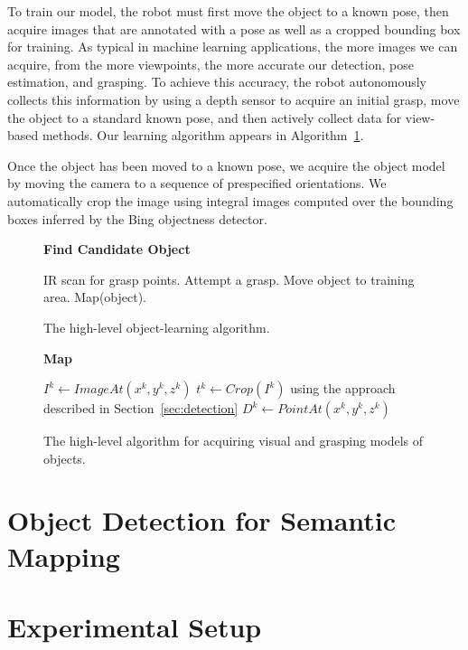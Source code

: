 \documentclass[conference]{IEEEtran}
\begin{document}
To train our model, the robot must first move the object to a known
pose, then acquire images that are annotated with a pose as well as a
cropped bounding box for training.  As typical in machine learning
applications, the more images we can acquire, from the more
viewpoints, the more accurate our detection, pose estimation, and
grasping.  To achieve this accuracy, the robot autonomously collects
this information by using a depth sensor to acquire an initial grasp,
move the object to a standard known pose, and then actively collect
data for view-based methods.  Our learning algorithm appears in
Algorithm~\ref{alg:learning}.

Once the object has been moved to a known pose, we acquire the object
model by moving the camera to a sequence of prespecified orientations.
We automatically crop the image using integral images computed over
the bounding boxes inferred by the Bing objectness detector.


\begin{figure}
  \textbf{Find Candidate Object}
  \begin{algorithmic}
      \STATE IR scan for grasp points.
      \STATE Attempt a grasp.
        \STATE Move object to training area.
        \STATE Map(object).
      \ENDIF
    \ENDWHILE
  \end{algorithmic}
  \caption{The high-level object-learning algorithm.\label{alg:learning}}
\end{figure}


\begin{figure}
  \textbf{Map}
  \begin{algorithmic}
    \STATE $I^k \gets ImageAt (x^k, y^k, z^k)$
    \STATE $t^k \gets Crop(I^k)$ using the approach described in Section~\ref{sec:detection}
    \STATE $D^k \gets PointAt(x^k, y^k, z^k)$
    \ENDFOR
  \end{algorithmic}
  \caption{The high-level algorithm for acquiring visual and grasping
    models of objects.}
\end{figure}


\section{Object Detection for Semantic Mapping}
\label{sec:mapping}
 
\section{Experimental Setup}
\end{document}
